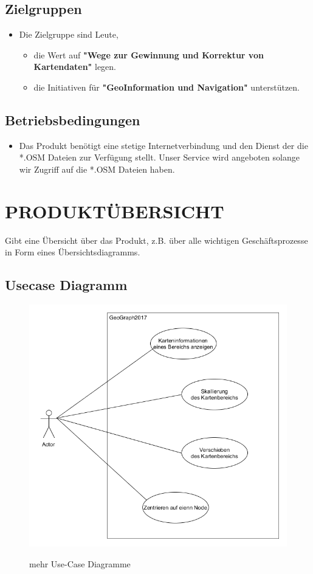 	\subsection{Zielgruppen}
	\begin{itemize}
		\item Die Zielgruppe sind Leute, 
		\begin{itemize}
			\item die Wert auf \textbf{"Wege zur Gewinnung und Korrektur von Kartendaten"} legen.
			\item die Initiativen für \textbf{"GeoInformation und Navigation"} unterstützen.
		\end{itemize}
	\end{itemize}
	\subsection{Betriebsbedingungen}
	\begin{itemize}
		\item Das Produkt benötigt eine stetige Internetverbindung und den Dienst der die *.OSM Dateien zur Verfügung stellt. Unser Service wird angeboten solange wir Zugriff auf die *.OSM Dateien haben.
	\end{itemize}
	
	
	\section{\Large PRODUKTÜBERSICHT}
	Gibt eine Übersicht über das Produkt, z.B. über alle wichtigen Geschäftsprozesse in Form eines Übersichtsdiagramms.
	\subsection{Usecase Diagramm}
	\begin{figure}[H]
	\centering
	\includegraphics[width=0.7\linewidth]{images/Usecases}
	\caption{}
	\label{fig:GUI}
	mehr Use-Case Diagramme
	\end{figure}
